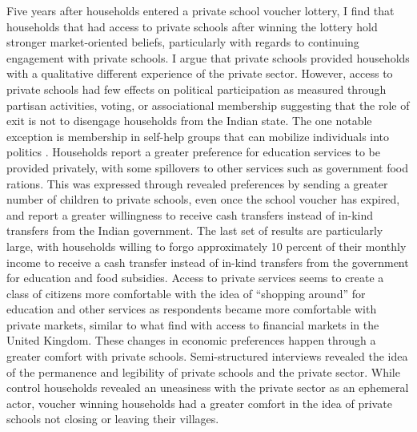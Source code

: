 \documentclass[hidelinks, 12pt, titlepage]{article}
\begin{document}
	Five years after households entered a private school voucher lottery, I find that households that had access to private schools after winning the lottery hold stronger market-oriented beliefs, particularly with regards to continuing engagement with private schools.  I argue that private schools provided households with a qualitative different experience of the private sector.  However, access to private schools had few effects on political participation as measured through partisan activities, voting, or associational membership suggesting that the role of exit is not to disengage households from the Indian state. The one notable exception is membership in self-help groups that can mobilize individuals into politics \citep{Prillaman2021}.  Households report a greater preference for education services to be provided privately, with some spillovers to other services such as government food rations.  This was expressed through revealed preferences by sending a greater number of children to private schools, even once the school voucher has expired, and report a greater willingness to receive cash transfers instead of in-kind transfers from the Indian government.  The last set of results are particularly large, with households willing to forgo approximately 10 percent of their monthly income to receive a cash transfer instead of in-kind transfers from the government for education and food subsidies.  Access to private services seems to create a class of citizens more comfortable with the idea of ``shopping around'' for education and other services \citep{Jeffery2008} as respondents became more comfortable with private markets, similar to what \cite{Margalit2020} find with access to financial markets in the United Kingdom.  These changes in economic preferences happen through a greater comfort with private schools.  Semi-structured interviews revealed the idea of the permanence and legibility of private schools and the private sector.  While control households revealed an uneasiness with the private sector as an ephemeral actor, voucher winning households had a greater comfort in the idea of private schools not closing or leaving their villages.
\end{document}
